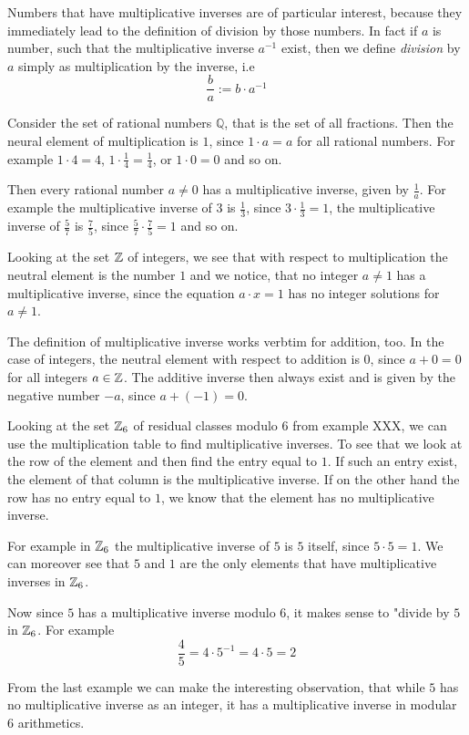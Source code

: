 Numbers that have multiplicative inverses are of particular interest, because they immediately lead to the definition of division by those numbers. In fact if $a$ is number, such that the multiplicative inverse $a^{-1}$ exist, then we define \textit{division} by $a$ simply as multiplication by the inverse, i.e
\begin{equation}
\frac{b}{a}:= b\cdot a^{-1}
\end{equation}
\begin{example} Consider the set of rational numbers $\mathbb{Q}$, that is the set of all fractions. Then the neural element of multiplication is $1$, since $1\cdot a = a$ for all rational numbers. For example $1\cdot 4=4$, $1\cdot \frac{1}{4}=\frac{1}{4}$, or $1\cdot 0 =0$ and so on.

Then every rational number $a\neq 0$ has a multiplicative inverse, given by $\frac{1}{a}$. 
For example the multiplicative inverse of $3$ is $\frac{1}{3}$, since $3\cdot \frac{1}{3}=1$, the multiplicative inverse of $\frac{5}{7}$ is $\frac{7}{5}$, since $\frac{5}{7}\cdot \frac{7}{5}=1$ and so on. 
\end{example}
\begin{example}Looking at  the set $\mathbb{Z}$ of integers, we see that with respect to multiplication the neutral element is the number $1$ and we notice, that no integer $a\neq 1$ has a multiplicative inverse, since the equation $a\cdot x =1$ has no integer solutions for $a\neq 1$. 

The definition of multiplicative inverse works verbtim for addition, too. In the case of integers, the neutral element with respect to addition is $0$, since $a+0=0$ for all integers $a\in\mathbb{Z}$. The additive inverse then always exist and is given by the negative number $-a$, since $a+(-1)=0$.  
\end{example}
\begin{example} Looking at the set $\mathbb{Z}_6$ of residual classes modulo $6$ from example XXX, we can use the multiplication table to find multiplicative inverses. To see that we look at the row of the element and then find the entry equal to $1$. If such an entry exist, the element of that column is the multiplicative inverse. If on the other hand the row has no entry equal to $1$, we know that the element has no multiplicative inverse.

For example in $\mathbb{Z}_6$ the multiplicative inverse of $5$ is $5$ itself, since $5\cdot 5=1$. We can moreover see that $5$ and $1$ are the only elements that have multiplicative inverses in $\mathbb{Z}_6$. 

Now since $5$ has a multiplicative inverse modulo $6$, it makes sense to "divide by $5$ in $\mathbb{Z}_6$. For example
$$
\frac{4}{5}= 4\cdot 5^{-1} = 4\cdot 5 = 2
$$ 
\end{example}
From the last example we can make the interesting observation, that while $5$ has no multiplicative inverse as an integer, it has a multiplicative inverse in modular $6$ arithmetics. 

